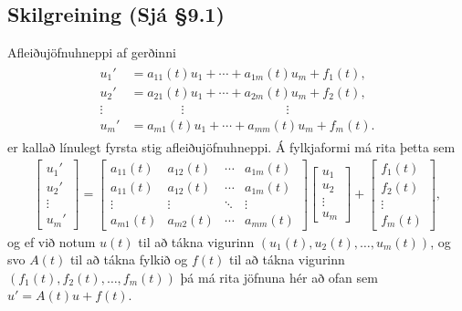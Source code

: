 \documentclass[a4paper,10pt,icelandic]{sphinxmanual}
\begin{document}
\subsection{Skilgreining (Sjá \S{}9.1)}
\label{\detokenize{Kafli09:skilgreining-sja-9-1}}
Afleiðujöfnuhneppi af gerðinni
\begin{equation*}
\begin{split}\begin{aligned}
u_1'&=a_{11}(t)u_1+\cdots+a_{1m}(t)u_m+f_1(t),\\
u_2'&=a_{21}(t)u_1+\cdots+a_{2m}(t)u_m+f_2(t),\\
\vdots&\qquad \qquad \vdots\qquad \qquad \qquad \qquad \vdots\\
u_m'&=a_{m1}(t)u_1+\cdots+a_{mm}(t)u_m+f_m(t).\end{aligned}\end{split}
\end{equation*}
er kallað línulegt fyrsta stig afleiðujöfnuhneppi. Á fylkjaformi má rita þetta sem
\begin{equation*}
\begin{split}\begin{bmatrix}u_1'\\u_2'\\\vdots\\u_m'\end{bmatrix}
=\begin{bmatrix}a_{11}(t)&a_{12}(t)&\cdots&a_{1m}(t)\\
a_{11}(t)&a_{12}(t)&\cdots&a_{1m}(t)\\
\vdots&\vdots&\ddots&\vdots\\
a_{m1}(t)&a_{m2}(t)&\cdots&a_{mm}(t)\end{bmatrix}
\begin{bmatrix}u_1 \\u_2 \\\vdots\\u_m\end{bmatrix}
+\begin{bmatrix}f_1(t) \\f_2(t) \\\vdots\\f_m(t)\end{bmatrix},\end{split}
\end{equation*}
og ef við notum \(u(t)\) til að tákna vigurinn \((u_1(t), u_2(t), \ldots, u_m(t))\), og svo \(A(t)\) til að tákna fylkið og \(f(t)\) til að tákna vigurinn \((f_1(t), f_2(t), \ldots, f_m(t))\) þá má rita jöfnuna hér að ofan sem \(u'=A(t)u+f(t)\).
\end{document}
